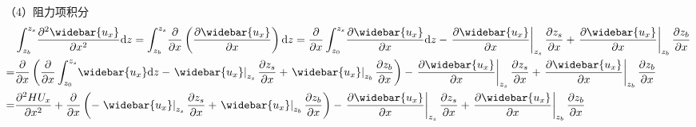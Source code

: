 （4）阻力项积分
\begin{equation}
  \begin{aligned}
    &\int_{z_{b}}^{ z_{s}}\!
    \frac{\partial^{2} \widebar{u_{x}}}{\partial x^{2}}
    \mathrm{d}z
    =
    \int_{z_{b}}^{ z_{s}}\!
    \frac{\partial}{\partial x}
    \left(\frac{\partial \widebar{u_{x}}}{\partial x}\right)
    \mathrm{d}z
    =
    \frac{\partial}{\partial x}
    \int_{z_0}^{ z_{s}}\!
    \frac{\partial \widebar{u_{x}}}{\partial x}
    \mathrm{d}z
    -
    \left.\frac{\partial \widebar{u_{x}}}{\partial x}\right|_{z_{s}}\frac{\partial  z_{s}}{\partial x}
    +
    \left.\frac{\partial \widebar{u_{x}}}{\partial x}\right|_{z_{b}}\frac{\partial z_{b}}{\partial x}
    \\
    =&
    \frac{\partial}{\partial x}
    \left(
    \frac{\partial}{\partial x}
    \int_{z_0}^{ z_{s}}\!
    \widebar{u_{x}}
    \mathrm{d}z
    -
    \left.\widebar{u_{x}}\right|_{z_{s}}\frac{\partial  z_{s}}{\partial x}
    +
    \left.\widebar{u_{x}}\right|_{z_{b}}\frac{\partial z_{b}}{\partial x}
    \right)
    -
    \left.\frac{\partial \widebar{u_{x}}}{\partial x}\right|_{z_{s}}\frac{\partial  z_{s}}{\partial x}
    +
    \left.\frac{\partial \widebar{u_{x}}}{\partial x}\right|_{z_{b}}\frac{\partial z_{b}}{\partial x}
      \\
    =&
    \frac{\partial^{2} HU_{x}}{\partial x^{2}} +
    \frac{\partial}{\partial x}
    \left(
    -
    \left.\widebar{u_{x}}\right|_{z_{s}}\frac{\partial  z_{s}}{\partial x}
    +
    \left.\widebar{u_{x}}\right|_{z_{b}}\frac{\partial z_{b}}{\partial x}
    \right)
    -
    \left.\frac{\partial \widebar{u_{x}}}{\partial x}\right|_{z_{s}}\frac{\partial  z_{s}}{\partial x}
    +
    \left.\frac{\partial \widebar{u_{x}}}{\partial x}\right|_{z_{b}}\frac{\partial z_{b}}{\partial x}
  \end{aligned}
  \label{EqCGe_Shear_1}
\end{equation}

